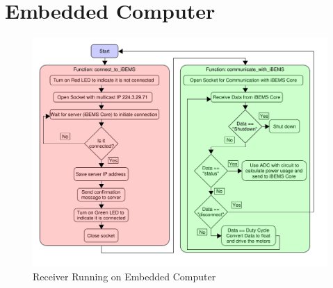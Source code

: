 \section{Embedded Computer}

\begin{figure}[H]
    \centering
    \includegraphics[scale=0.5]{figs/beaglebone/Beaglebone_Receiver_Diagram.pdf}
    \caption{Receiver Running on Embedded Computer}
    \label{fig:Beaglebone_Receiver_Diagram}
\end{figure}


